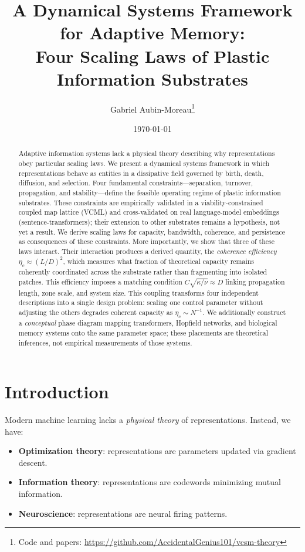 \documentclass[11pt]{article}
\title{A Dynamical Systems Framework for Adaptive Memory:\\Four Scaling Laws of Plastic Information Substrates}
\author{Gabriel Aubin-Moreau\thanks{Code and papers: \url{https://github.com/AccidentalGenius101/vcsm-theory}}}
\date{\today}
\begin{document}
\maketitle

\begin{abstract}
Adaptive information systems lack a physical theory describing why representations obey particular scaling laws. We present a dynamical systems framework in which representations behave as entities in a dissipative field governed by birth, death, diffusion, and selection. Four fundamental constraints---separation, turnover, propagation, and stability---define the feasible operating regime of plastic information substrates. These constraints are empirically validated in a viability-constrained coupled map lattice (VCML) and cross-validated on real language-model embeddings (sentence-transformers); their extension to other substrates remains a hypothesis, not yet a result. We derive scaling laws for capacity, bandwidth, coherence, and persistence as consequences of these constraints. More importantly, we show that three of these laws interact. Their interaction produces a derived quantity, the \emph{coherence efficiency} $\eta_c \approx (L/D)^2$, which measures what fraction of theoretical capacity remains coherently coordinated across the substrate rather than fragmenting into isolated patches. This efficiency imposes a matching condition $C\sqrt{\kappa/\nu} \approx D$ linking propagation length, zone scale, and system size. This coupling transforms four independent descriptions into a single design problem: scaling one control parameter without adjusting the others degrades coherent capacity as $\eta_c \sim N^{-1}$. We additionally construct a \emph{conceptual} phase diagram mapping transformers, Hopfield networks, and biological memory systems onto the same parameter space; these placements are theoretical inferences, not empirical measurements of those systems.
\end{abstract}

\section{Introduction}

Modern machine learning lacks a \emph{physical theory} of representations. Instead, we have:
\begin{itemize}
\item \textbf{Optimization theory}: representations are parameters updated via gradient descent.
\item \textbf{Information theory}: representations are codewords minimizing mutual information.
\item \textbf{Neuroscience}: representations are neural firing patterns.
\end{itemize}
\end{document}
